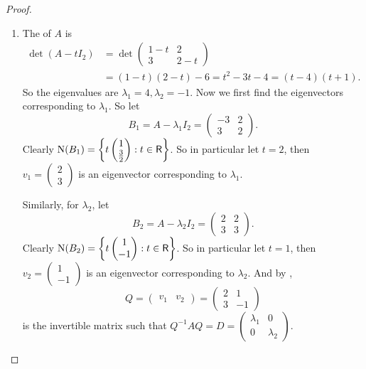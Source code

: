 \begin{proof} \ 

\begin{enumerate}
\item The \CPOLY{} of \(A\) is
\begin{align*}
    \det(A - tI_2) & = \det \begin{pmatrix}
        1-t & 2 \\ 3 & 2-t
    \end{pmatrix} \\
        & = (1 - t)(2 - t) - 6 = t^2 - 3t - 4 = (t - 4)(t + 1).
\end{align*}
So the eigenvalues are \(\lambda_1 = 4, \lambda_2 = -1\).
Now we first find the eigenvectors corresponding to \(\lambda_1\).
So let
\[
    B_1 = A - \lambda_1 I_2 = \begin{pmatrix}
        -3 & 2 \\ 3 & 2
    \end{pmatrix}.
\]
Clearly \(\mathrm{N}(B_1) = \left\{ t \begin{pmatrix} 1 \\ \frac{3}{2} \end{pmatrix} : t \in \textsf{R} \right\}\).
So in particular let \(t = 2\), then \(v_1 = \begin{pmatrix} 2 \\ 3 \end{pmatrix}\) is an eigenvector corresponding to \(\lambda_1\).

Similarly, for \(\lambda_2\), let
\[
    B_2 = A - \lambda_2 I_2 = \begin{pmatrix}
        2 & 2 \\ 3 & 3
    \end{pmatrix}.
\]
Clearly \(\mathrm{N}(B_2) = \left\{ t \begin{pmatrix} 1 \\ -1 \end{pmatrix} : t \in \textsf{R} \right\}\).
So in particular let \(t = 1\), then \(v_2 = \begin{pmatrix} 1 \\ -1 \end{pmatrix}\) is an eigenvector corresponding to \(\lambda_2\).
And by ,
\[
    Q = \begin{pmatrix} v_1 & v_2 \end{pmatrix}
      = \begin{pmatrix}
            2 & 1 \\
            3 & -1
        \end{pmatrix}
\]
is the invertible matrix such that \(Q^{-1} A Q = D = \begin{pmatrix}
    \lambda_1 & 0 \\ 0 & \lambda_2 \end{pmatrix}\).


\end{enumerate}
\end{proof}
